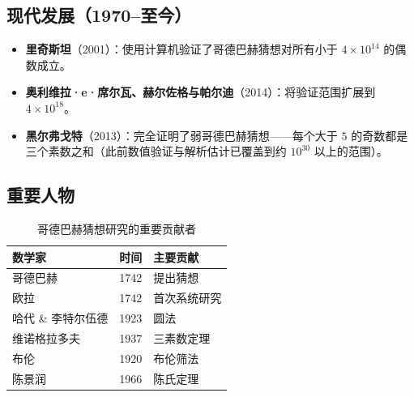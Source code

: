 \subsection{现代发展（1970--至今）}

\begin{itemize}
    \item \textbf{里奇斯坦}（2001）：使用计算机验证了哥德巴赫猜想对所有小于 $4 \times 10^{14}$ 的偶数成立。
    \item \textbf{奥利维拉·e·席尔瓦、赫尔佐格与帕尔迪}（2014）：将验证范围扩展到 $4 \times 10^{18}$\cite{oliveira2014computational}。
    \item \textbf{黑尔弗戈特}（2013）：完全证明了弱哥德巴赫猜想——每个大于 $5$ 的奇数都是三个素数之和\cite{helfgott2013ternary}（此前数值验证与解析估计已覆盖到约 $10^{30}$ 以上的范围）。
\end{itemize}

\subsection{重要人物}

\begin{table}[htbp]
    \centering
    \caption{哥德巴赫猜想研究的重要贡献者}
    \label{tab:contributors}
    \begin{tabular}{@{}lll@{}}
        \toprule
        \textbf{数学家} & \textbf{时间} & \textbf{主要贡献} \\
        \midrule
        哥德巴赫 & 1742 & 提出猜想 \\
        欧拉 & 1742 & 首次系统研究 \\
        哈代 \& 李特尔伍德 & 1923 & 圆法 \\
        维诺格拉多夫 & 1937 & 三素数定理 \\
        布伦 & 1920 & 布伦筛法 \\
        陈景润 & 1966 & 陈氏定理 \\
        \bottomrule
    \end{tabular}
\end{table}
